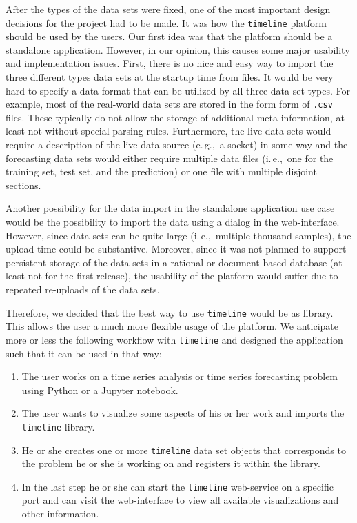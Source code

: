 \documentclass[runningheads,a4paper,11pt]{llncs}
\newcommand{\eg}{e.\,g.,\ }
\newcommand{\ie}{i.\,e.,\ }
\begin{document}
After the types of the data sets were fixed, one of the most important design decisions for the project had to be made. 
It was how the \texttt{timeline} platform should be used by the users.
Our first idea was that the platform should be a standalone application.
However, in our opinion, this causes some major usability and implementation issues.
First, there is no nice and easy way to import the three different types data sets at the startup time from files.
It would be very hard to specify a data format that can be utilized by all three data set types.
For example, most of the real-world data sets are stored in the form form of \texttt{.csv} files.
These typically do not allow the storage of additional meta information, at least not without special parsing rules.
Furthermore, the live data sets would require a description of the live data source (\eg a socket) in some way and the forecasting data sets would either require multiple data files (\ie one for the training set, test set, and the prediction) or one file with multiple disjoint sections.

Another possibility for the data import in the standalone application use case would be the possibility to import the data using a dialog in the web-interface.
However, since data sets can be quite large (\ie multiple thousand samples), the upload time could be substantive. 
Moreover, since it was not planned to support persistent storage of the data sets in a rational or document-based database (at least not for the first release), the usability of the platform would suffer due to repeated re-uploads of the data sets. 

Therefore, we decided that the best way to use \texttt{timeline} would be as library. 
This allows the user a much more flexible usage of the platform.
We anticipate more or less the following workflow with \texttt{timeline} and designed the application such that it can be used in that way:

\begin{enumerate}
 \item The user works on a time series analysis or time series forecasting problem using Python or a Jupyter notebook.

 \item The user wants to visualize some aspects of his or her work and imports the \texttt{timeline} library.

 \item He or she creates one or more \texttt{timeline} data set objects that corresponds to the problem he or she is working on and registers it within the library.
 
 \item In the last step he or she can start the \texttt{timeline} web-service on a specific port and can visit the web-interface to view all available visualizations and other information.
\end{enumerate}
\end{document}
